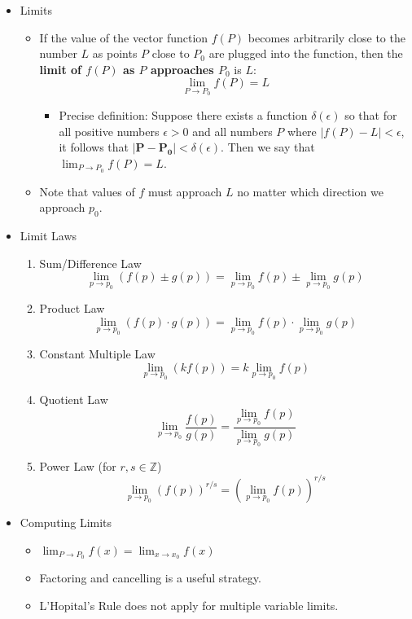 \documentclass[12pt]{article}
\newcommand{\ds}{\displaystyle}
\renewcommand{\vec}[1]{\mathbf{#1}}
\newcommand{\<}{\left<}
\renewcommand{\>}{\right>}
\begin{document}
  \begin{itemize}
  
    \item Limits
      \begin{itemize}
        \item If the value of the vector function $f(P)$ becomes arbitrarily close to the number $L$ as points $P$ close to $P_0$ are plugged into the function, then the \textbf{limit of $f(P)$ as $P$ approaches $P_0$} is $L$: \[\lim_{P\to P_0} f(P) = L\]
          \begin{itemize}
            \item Precise definition: \newline
            Suppose there exists a function $\delta(\epsilon)$ so that for all positive numbers $\epsilon>0$ and all numbers $P$ where $|f(P)-L|<\epsilon$, it follows that $|\vec{P}-\vec{P_0}|<\delta(\epsilon)$. Then we say that $\lim_{P\to P_0} f(P) = L$.
          \end{itemize}
        \item Note that values of $f$ must approach $L$ no matter which direction we approach $p_0$.
      \end{itemize}
      
    \item Limit Laws
    
      \begin{enumerate}
        \item Sum/Difference Law \[\lim_{p\to p_0}(f(p)\pm g(p)) = \lim_{p\to p_0}f(p) \pm \lim_{p\to p_0}g(p)\]
        \item Product Law \[\lim_{p\to p_0}(f(p)\cdot g(p)) = \lim_{p\to p_0}f(p) \cdot \lim_{p\to p_0}g(p)\]
        \item Constant Multiple Law \[\lim_{p\to p_0}(kf(p)) = k\lim_{p\to p_0}f(p)\]
        \item Quotient Law \[\lim_{p\to p_0}\frac{f(p)}{g(p)} = \frac{\ds \lim_{p\to p_0}f(p)}{\ds \lim_{p\to p_0}g(p)}\]
        \item Power Law (for $r,s\in \mathbb{Z}$) \[\lim_{p\to p_0}(f(p))^{r/s} = \left(\lim_{p\to p_0}f(p)\right)^{r/s}\]
      \end{enumerate}

    \newpage
            
    \item Computing Limits
      
        \begin{itemize}
        \item $\ds \lim_{P \to P_0} f(x) = \lim_{x\to x_0} f(x)$
        \item Factoring and cancelling is a useful strategy.
        \item L'Hopital's Rule does not apply for multiple variable limits.
        \end{itemize}
    

\end{itemize}
\end{document}
